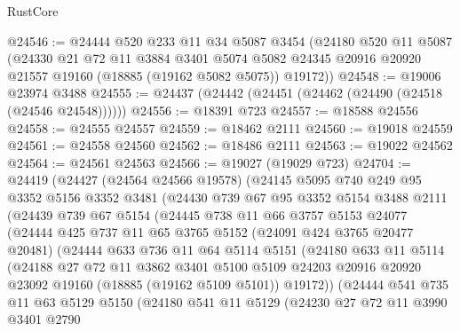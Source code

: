 \begin{lexlean}{RustCore}
\begin{coremodule}
@24546 := @24444
    @520
    @233
    @11
    @34
    @5087
    @3454
    (@24180
      @520
      @11
      @5087
      (@24330
        @21
        @72
        @11
        @3884
        @3401
        @5074
        @5082
        @24345
        @20916
        @20920
        @21557
        @19160
        (@18885 (@19162 @5082 @5075))
        @19172))
@24548 := @19006 @23974 @3488
@24555 := @24437 (@24442 (@24451 (@24462 (@24490 (@24518 (@24546 @24548))))))
@24556 := @18391 @723
@24557 := @18588 @24556
@24558 := @24555 @24557
@24559 := @18462 @2111
@24560 := @19018 @24559
@24561 := @24558 @24560
@24562 := @18486 @2111
@24563 := @19022 @24562
@24564 := @24561 @24563
@24566 := @19027 (@19029 @723)
@24704 := @24419
    (@24427
      (@24564 @24566 @19578)
      (@24145
        @5095
        @740
        @249
        @95
        @3352
        @5156
        @3352
        @3481
        (@24430
          @739
          @67
          @95
          @3352
          @5154
          @3488
          @2111
          (@24439
            @739
            @67
            @5154
            (@24445
              @738
              @11
              @66
              @3757
              @5153
              @24077
              (@24444
                @425
                @737
                @11
                @65
                @3765
                @5152
                (@24091 @424 @3765 @20477 @20481)
                (@24444
                  @633
                  @736
                  @11
                  @64
                  @5114
                  @5151
                  (@24180
                    @633
                    @11
                    @5114
                    (@24188
                      @27
                      @72
                      @11
                      @3862
                      @3401
                      @5100
                      @5109
                      @24203
                      @20916
                      @20920
                      @23092
                      @19160
                      (@18885 (@19162 @5109 @5101))
                      @19172))
                  (@24444
                    @541
                    @735
                    @11
                    @63
                    @5129
                    @5150
                    (@24180
                      @541
                      @11
                      @5129
                      (@24230
                        @27
                        @72
                        @11
                        @3990
                        @3401
                        @2790

\end{coremodule}
\end{lexlean}
